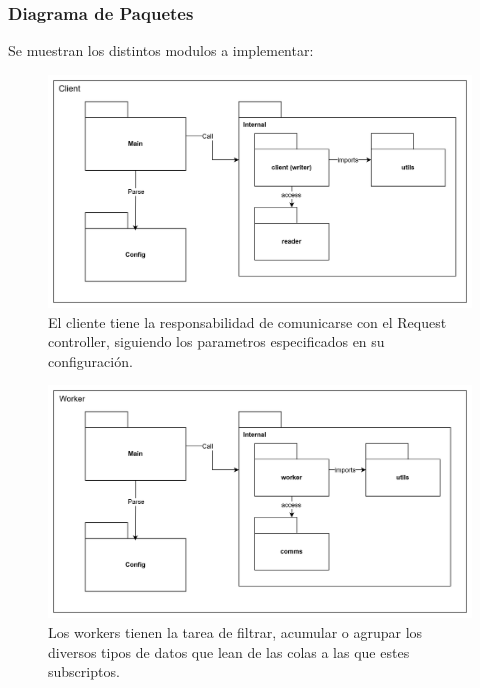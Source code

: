 \documentclass[titlepage,a4paper]{article}
\begin{document}
\subsubsection{Diagrama de Paquetes}
Se muestran los distintos modulos a implementar:
\begin{figure}[H]
    \centering
    \includegraphics[width=1\linewidth]{cliente.png}
    \caption{El cliente tiene la responsabilidad de comunicarse con el Request controller, siguiendo los parametros especificados en su configuración.}
\end{figure}
\begin{figure}[H]
    \centering
    \includegraphics[width=1\linewidth]{worker.png}
    \caption{Los workers tienen la tarea de filtrar, acumular o agrupar los diversos tipos de datos que lean de las colas a las que estes subscriptos.}
\end{figure}
\end{document}
